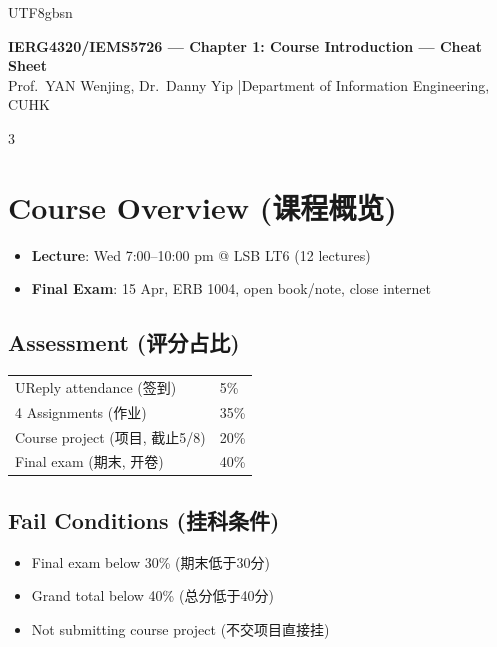 \documentclass[10pt,landscape,a4paper]{article}
\newcommand{\zhint}[1]{{\scriptsize\color{gray!70!black}#1}}
\begin{document}
\begin{CJK}{UTF8}{gbsn}

\begin{center}
    {\large\bfseries IERG4320/IEMS5726 --- Chapter 1: Course Introduction --- Cheat Sheet}\\[2pt]
    {\small Prof.\ YAN Wenjing, Dr.\ Danny Yip \quad|\quad Department of Information Engineering, CUHK}
\end{center}

\vspace{2pt}
\begin{multicols}{3}

\section{Course Overview \zhint{(课程概览)}}

\begin{itemize}[leftmargin=*, nosep, itemsep=1pt]
    \item \textbf{Lecture}: Wed 7:00--10:00 pm @ LSB LT6 (12 lectures)
    \item \textbf{Final Exam}: 15 Apr, ERB 1004, open book/note, close internet
\end{itemize}

\subsection{Assessment \zhint{(评分占比)}}
\begin{tabular}{ll}
UReply attendance \zhint{(签到)} & 5\% \\
4 Assignments \zhint{(作业)} & 35\% \\
Course project \zhint{(项目, 截止5/8)} & 20\% \\
Final exam \zhint{(期末, 开卷)} & 40\% \\
\end{tabular}

\subsection{Fail Conditions \zhint{(挂科条件)}}
\begin{itemize}[leftmargin=*, nosep, itemsep=0pt]
    \item Final exam below 30\% \zhint{(期末低于30分)}
    \item Grand total below 40\% \zhint{(总分低于40分)}
    \item Not submitting course project \zhint{(不交项目直接挂)}
\end{itemize}


\end{multicols}
\end{CJK}
\end{document}
